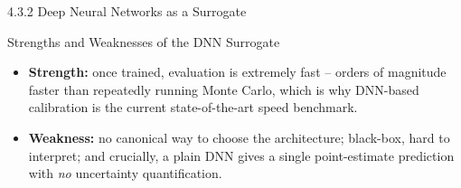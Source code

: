 \documentclass[aspectratio=169,10pt]{beamer}
\begin{document}
\begin{frame}[allowframebreaks]{4.3.2 Deep Neural Networks as a Surrogate}
\begin{alertblock}{Strengths and Weaknesses of the DNN Surrogate}
\begin{itemize}
  \item \textbf{Strength:} once trained, evaluation is extremely fast --
        orders of magnitude faster than repeatedly running Monte Carlo,
        which is why DNN-based calibration is the current
        state-of-the-art speed benchmark.
  \item \textbf{Weakness:} no canonical way to choose the architecture;
        black-box, hard to interpret; and crucially, a plain DNN gives a
        single point-estimate prediction with \emph{no} uncertainty
        quantification.
\end{itemize}
\end{alertblock}

\end{frame}
\end{document}
